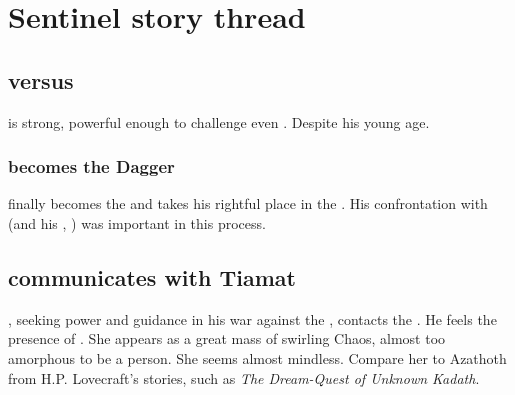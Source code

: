 














\section{Sentinel story thread}










\subsection{\Vizsherioch{} versus \Ishnaruchaefir}
\Vizsherioch{} is strong, powerful enough to challenge even \Ishnaruchaefir. Despite his young age. 





\subsubsection{\Vizsherioch{} becomes the Dagger}
%
\Vizsherioch{} finally becomes the  and takes his rightful place in the \matrix. 
His confrontation with \Ishnaruchaefir{} (and his , \Rystessakhin) was important in this process. 











\subsection{\Secherdamon{} communicates with Tiamat}
\Secherdamon, seeking power and guidance in his war against the \banes, contacts the \firstgendragons. He feels the presence of \Tiamat. She appears as a great mass of swirling Chaos, almost too amorphous to be a person. She seems almost mindless. Compare her to Azathoth from H.P. Lovecraft's stories, such as \emph{The Dream-Quest of Unknown Kadath}.

